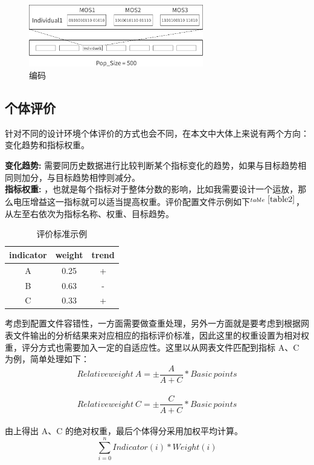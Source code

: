 \documentclass[14pt, a4paper]{article}
\begin{document}
        \begin{figure}[htbp]
            \centering
            \includegraphics[width= 3in]{fig/encoding_black.png}
            \caption{编码}
            \label{fig3}
        \end{figure}
    \subsection{个体评价}
        针对不同的设计环境个体评价的方式也会不同，在本文中大体上来说有两个方向：变化趋势和指标权重。
        
        \textbf{变化趋势: }需要同历史数据进行比较判断某个指标变化的趋势，如果与目标趋势相同则加分，与目标趋势相悖则减分。 \\
        
        \textbf{指标权重: }，也就是每个指标对于整体分数的影响，比如我需要设计一个运放，那么电压增益这一指标就可以适当提高权重。评价配置文件示例如下$^{table\ \ref{table2}}$，从左至右依次为指标名称、权重、目标趋势。
        
        \begin{table}[htbp]
            \centering
            \begin{tabular}{ccc}
                \toprule
                indicator & weight & trend \\
                \midrule
                A & 0.25 & + \\
                B & 0.63 & - \\
                C & 0.33 & + \\
                \bottomrule
            \end{tabular}
            \caption{评价标准示例}
            \label{table2}
        \end{table}
    
        考虑到配置文件容错性，一方面需要做查重处理，另外一方面就是要考虑到根据网表文件输出的分析结果来对应相应的指标评价标准，因此这里的权重设置为相对权重，评分方式也需要加入一定的自适应性。这里以从网表文件匹配到指标 A、C 为例，简单处理如下：\\
        $$Relative weight\ A = \pm \frac{A}{A+C}*Basic\ points$$ \\
        $$Relative weight\ C = \pm \frac{C}{A+C}*Basic\ points$$ \\
        由上得出 A、C 的绝对权重，最后个体得分采用加权平均计算。 \\
        $$\sum_{i=0}^{n} Indicator(i) * Weight(i)$$ 
        
\end{document}
